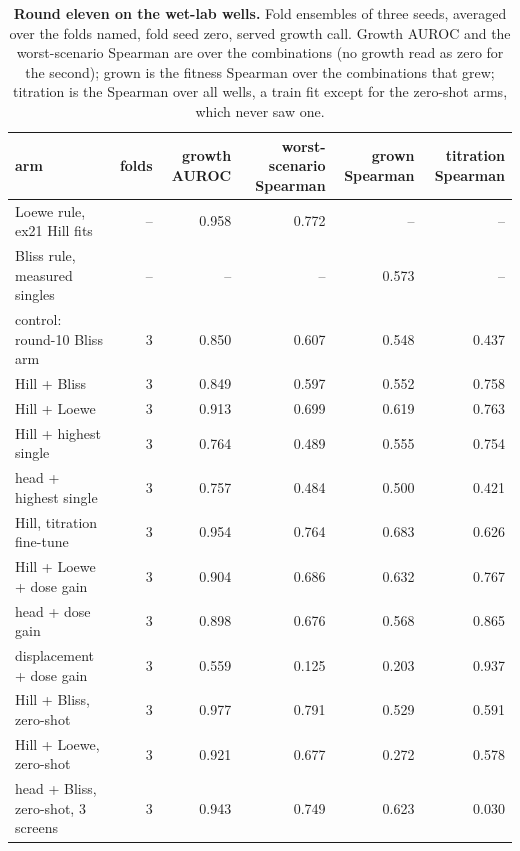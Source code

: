 \begin{table}[htbp]\centering\footnotesize
\caption{\textbf{Round eleven on the wet-lab wells.} Fold ensembles of three seeds, averaged over the folds named, fold seed zero, served growth call. Growth AUROC and the worst-scenario Spearman are over the \hydnCombinations{} combinations (no growth read as zero for the second); grown is the fitness Spearman over the combinations that grew; titration is the Spearman over all \extitration{} wells, a train fit except for the zero-shot arms, which never saw one.}\label{tab:r11host}
\begin{tabular}{lrrrrr}
\toprule
arm & folds & growth AUROC & worst-scenario Spearman & grown Spearman & titration Spearman \\
\midrule
Loewe rule, ex21 Hill fits & -- & 0.958 & 0.772 & -- & -- \\
Bliss rule, measured singles & -- & -- & -- & 0.573 & -- \\
\midrule
control: round-10 Bliss arm & 3 & 0.850 & 0.607 & 0.548 & 0.437 \\
Hill + Bliss & 3 & 0.849 & 0.597 & 0.552 & 0.758 \\
Hill + Loewe & 3 & 0.913 & 0.699 & 0.619 & 0.763 \\
Hill + highest single & 3 & 0.764 & 0.489 & 0.555 & 0.754 \\
head + highest single & 3 & 0.757 & 0.484 & 0.500 & 0.421 \\
Hill, titration fine-tune & 3 & 0.954 & 0.764 & 0.683 & 0.626 \\
Hill + Loewe + dose gain & 3 & 0.904 & 0.686 & 0.632 & 0.767 \\
head + dose gain & 3 & 0.898 & 0.676 & 0.568 & 0.865 \\
displacement + dose gain & 3 & 0.559 & 0.125 & 0.203 & 0.937 \\
Hill + Bliss, zero-shot & 3 & 0.977 & 0.791 & 0.529 & 0.591 \\
Hill + Loewe, zero-shot & 3 & 0.921 & 0.677 & 0.272 & 0.578 \\
head + Bliss, zero-shot, 3 screens & 3 & 0.943 & 0.749 & 0.623 & 0.030 \\
\bottomrule
\end{tabular}
\end{table}
